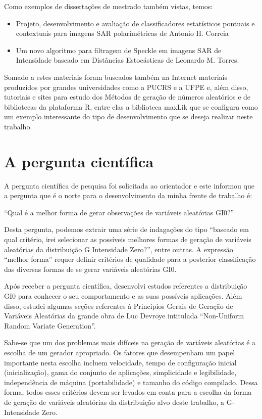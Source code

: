 Como exemplos de dissertações de mestrado também vistas, temos:

\begin{itemize}
	\item Projeto, desenvolvimento e avaliação de classificadores estatísticos pontuais e contextuais para imagens SAR polarimétricas de Antonio H. Correia
	\item Um novo algoritmo para filtragem de Speckle em imagens SAR de Intensidade baseado em Distâncias Estocásticas de Leonardo M. Torres.  

\end{itemize}

Somado a estes materiais foram buscados também na Internet materiais produzidos por grandes universidades como a PUCRS e a UFPE e, além disso, tutoriais e sites para estudo dos Métodos de geração de números aleatórios e de bibliotecas da plataforma R, entre elas a biblioteca maxLik que se configura como um exemplo interessante do tipo de desenvolvimento que se deseja realizar neste trabalho. 


\section{A pergunta científica}

A pergunta científica de pesquisa foi solicitada ao orientador e este informou que a pergunta que é o norte para o desenvolvimento da minha frente de trabalho é:

“Qual é a melhor forma de gerar observações de variáveis aleatórias GI0?”

Desta pergunta, podemos extrair uma série de indagações do tipo “baseado em qual critério, irei selecionar as possíveis melhores formas de geração de variáveis aleatórias da distribuição G Intensidade Zero?”, entre outras. A expressão “melhor forma” requer definir critérios de qualidade para a posterior classificação das diversas formas de se gerar variáveis aleatórias GI0.

Após receber a pergunta científica, desenvolvi estudos referentes a distribuição GI0 para conhecer o seu comportamento e as suas possíveis aplicações. Além disso, estudei algumas seções referentes à Princípios Gerais de Geração de Variáveis Aleatórias da grande obra de Luc Devroye intitulada “Non-Uniform Random Variate Generation”. 

Sabe-se que um dos problemas mais difíceis na geração de variáveis aleatórias é a escolha de um gerador apropriado. Os fatores que desempenham um papel importante nesta escolha incluem velocidade, tempo de configuração inicial (inicialização), gama do conjunto de aplicações, simplicidade e legibilidade, independência de máquina (portabilidade) e tamanho do código compilado. Dessa forma, todos esses critérios devem ser levados em conta para a escolha da forma de geração de variáveis aleatórias da distribuição alvo deste trabalho, a G-Intensidade Zero.

